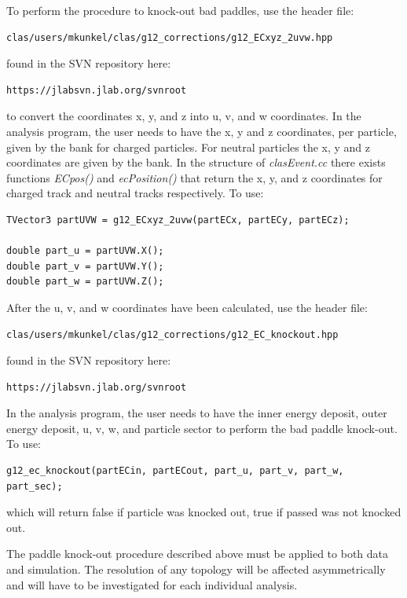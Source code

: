 To perform the procedure to knock-out bad  paddles, use the header file:
\begin{verbatim}
clas/users/mkunkel/clas/g12_corrections/g12_ECxyz_2uvw.hpp
\end{verbatim}
found in the SVN repository here:
\begin{verbatim}
https://jlabsvn.jlab.org/svnroot
\end{verbatim}
to convert the  coordinates x, y, and z into u, v, and w  coordinates. In the analysis program, the user needs to have the  x, y and z coordinates, per particle, given by the  bank for charged particles. For neutral particles the  x, y and z coordinates are given by the  bank. In the structure of \emph{clasEvent.cc} there exists functions \emph{ECpos()} and \emph{ ecPosition()} that return the  x, y, and z coordinates for charged track and neutral tracks respectively. To use:
\begin{verbatim}
TVector3 partUVW = g12_ECxyz_2uvw(partECx, partECy, partECz);

double part_u = partUVW.X();
double part_v = partUVW.Y();
double part_w = partUVW.Z();
\end{verbatim}
After the  u, v, and w coordinates have been calculated, use the header file:
\begin{verbatim}
clas/users/mkunkel/clas/g12_corrections/g12_EC_knockout.hpp
\end{verbatim}
found in the SVN repository here:
\begin{verbatim}
https://jlabsvn.jlab.org/svnroot
\end{verbatim}
In the analysis program, the user needs to have the  inner energy deposit,  outer energy deposit, u, v, w, and particle sector to perform the  bad paddle knock-out. To use:
\begin{verbatim}
g12_ec_knockout(partECin, partECout, part_u, part_v, part_w, part_sec);
\end{verbatim}
which will return false if particle was knocked out, true if passed was not knocked out.

\begin{v2}The paddle knock-out procedure described above must be applied to both data and simulation. The resolution of any topology will be affected asymmetrically and will have to be investigated for each individual analysis.\end{v2}

\FloatBarrier
